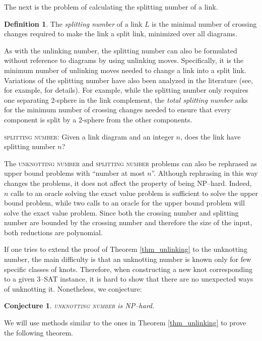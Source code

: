 \documentclass[12pt]{amsart}
\newtheorem{conj}[thm]{Conjecture}
\theoremstyle{definition}
\newtheorem{defn}[thm]{Definition}
\theoremstyle{remark}
\begin{document}
The next is the problem of calculating the splitting number of a link.
\begin{defn}
The \emph{splitting number} of a link $L$ is the minimal number of crossing changes required to make the link a split link, minimized over all diagrams.
\end{defn}
As with the unlinking number, the splitting number can also be formulated without reference to diagrams by using unlinking moves.
Specifically, it is the minimum number of unlinking moves needed to change a link into a split link.
Variations of the splitting number have also been analyzed in the literature (see, for example, \cite{Lackenby3} for details).
For example, while the splitting number only requires one separating 2-sphere in the link complement,  the \emph{total splitting number} asks for the minimum number of crossing changes needed to ensure that every component is split by a 2-sphere from the other components.

\vspace{0.14in}
\textsc{splitting number}: Given a link diagram and an integer $n$, does the link have splitting number $n$?
\vspace{0.14in}

The \textsc{unknotting number} and \textsc{splitting number} problems can also be rephrased as upper bound problems with ``number at most $n$''.
Although rephrasing in this way changes the problems, it does not affect the property of being NP--hard.
Indeed, $n$ calls to an oracle solving the exact value problem is sufficient to solve the upper bound problem, while two calls to an oracle for the upper bound problem will solve the exact value problem.
Since both the crossing number and splitting number are bounded by the crossing number and therefore the size of the input, both reductions are polynomial.

If one tries to extend the proof of Theorem \ref{thm_unlinking} to the unknotting number, the main difficulty is that an unknotting number is known only for few specific classes of knots.
Therefore, when constructing a new knot corresponding to a given 3--\textsc{SAT} instance, it is hard to show that there are no unexpected ways of unknotting it.
Nonetheless, we conjecture:

\begin{conj} \textsc{unknotting number} is NP--hard.
\end{conj}

We will use methods similar to the ones in Theorem \ref{thm_unlinking} to prove the following theorem.
\end{document}
